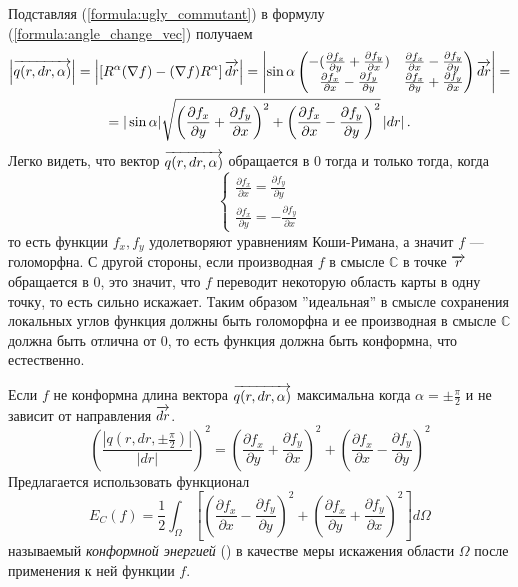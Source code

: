 Подставляя (\ref{formula:ugly_commutant}) в формулу (\ref{formula:angle_change_vec}) получаем
\begin{multline*} 
  \left| \overrightarrow{q(r, dr, \alpha)} \right| = 
  \left| \left[R^\alpha (\nabla f) - (\nabla f) R^\alpha \right] \overrightarrow{dr} \right| 
  = \left| \sin \alpha \begin{pmatrix}
    -(\frac{\partial f_x}{\partial y} + \frac{\partial f_y}{\partial x}) &
    \frac{\partial f_x}{\partial x} - \frac{\partial f_y}{\partial y} \\
    \frac{\partial f_x}{\partial x} - \frac{\partial f_y}{\partial y} &
    \frac{\partial f_x}{\partial y} + \frac{\partial f_y}{\partial x} 
  \end{pmatrix} \overrightarrow{dr} \right| = \\
  = |\sin \alpha| \sqrt{\left(\frac{\partial f_x}{\partial y} + \frac{\partial f_y}{\partial x}\right)^2 + \left(\frac{\partial f_x}{\partial x} - \frac{\partial f_y}{\partial y}\right)^2} \left| dr \right|.
\end{multline*}
Легко видеть, что вектор $\overrightarrow{q(r, dr, \alpha)}$ обращается в 0 тогда и только тогда, когда
$$\begin{cases}
  \frac{\partial f_x}{\partial x} = \frac{\partial f_y}{\partial y} \\
  \frac{\partial f_x}{\partial y} = -\frac{\partial f_y}{\partial x} 
\end{cases}$$
то есть функции $f_x, f_y$ удолетворяют уравнениям Коши-Римана, а значит $f$ --- голоморфна. 
С другой стороны, если производная $f$ в смысле $\mathbb{C}$ в точке $\overrightarrow{r}$ обращается в 0, это значит, что
$f$ переводит некоторую область карты в одну точку, то есть сильно искажает. Таким образом ''идеальная'' в
смысле сохранения локальных углов функция должны быть голоморфна и ее производная в смысле $\mathbb{C}$ должна
быть отлична от 0, то есть функция должна быть конформна, что естественно.

Если $f$ не конформна длина вектора $\overrightarrow{q(r, dr, \alpha)}$ максимальна когда $\alpha = \pm \frac{\pi}{2}$ 
и не зависит от направления $\overrightarrow{dr}$. 
\begin{equation*}
  \left(\frac{\left| {q(r, dr, \pm \frac{\pi}{2})} \right|}{|dr|}\right)^2 = 
  \left(\frac{\partial f_x}{\partial y} + \frac{\partial f_y}{\partial x}\right)^2 + 
  \left(\frac{\partial f_x}{\partial x} - \frac{\partial f_y}{\partial y}\right)^2 
\end{equation*}
Предлагается использовать функционал 
\begin{equation}
\label{formula:EC_Def}
  E_C(f) = \frac{1}{2} \int_{\Omega}\left[{ 
    \left(\frac{\partial f_x}{\partial x} - \frac{\partial f_y}{\partial y}\right)^2 + 
    \left(\frac{\partial f_x}{\partial y} + \frac{\partial f_y}{\partial x}\right)^2} \right] d\Omega   
\end{equation}
называемый \textit{конформной энергией} (\cite{Polthier}) в качестве меры искажения области $\Omega$ после
применения к ней функции $f$. 

